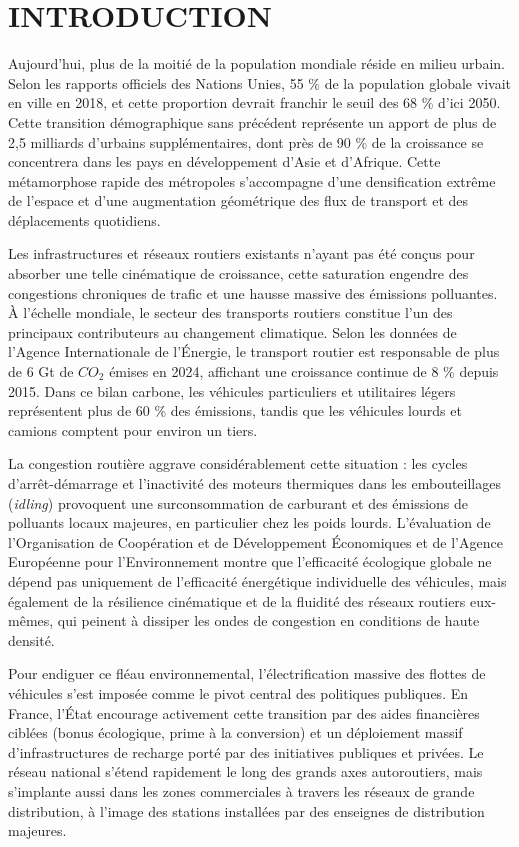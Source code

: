 \documentclass[10pt, a4paper]{article}
\begin{document}
\newpage

\section{INTRODUCTION}\label{introduction}

Aujourd'hui, plus de la moitié de la population mondiale réside en
milieu urbain. Selon les rapports officiels des Nations Unies, 55 \% de
la population globale vivait en ville en 2018, et cette proportion
devrait franchir le seuil des 68 \% d'ici 2050. Cette transition
démographique sans précédent représente un apport de plus de 2,5
milliards d'urbains supplémentaires, dont près de 90 \% de la croissance
se concentrera dans les pays en développement d'Asie et d'Afrique. Cette
métamorphose rapide des métropoles s'accompagne d'une densification
extrême de l'espace et d'une augmentation géométrique des flux de
transport et des déplacements quotidiens.

Les infrastructures et réseaux routiers existants n'ayant pas été conçus
pour absorber une telle cinématique de croissance, cette saturation
engendre des congestions chroniques de trafic et une hausse massive des
émissions polluantes. À l'échelle mondiale, le secteur des transports
routiers constitue l'un des principaux contributeurs au changement
climatique. Selon les données de l'Agence Internationale de l'Énergie,
le transport routier est responsable de plus de 6 Gt de \(CO_2\) émises
en 2024, affichant une croissance continue de 8 \% depuis 2015. Dans ce
bilan carbone, les véhicules particuliers et utilitaires légers
représentent plus de 60 \% des émissions, tandis que les véhicules
lourds et camions comptent pour environ un tiers.

La congestion routière aggrave considérablement cette situation : les
cycles d'arrêt-démarrage et l'inactivité des moteurs thermiques dans les
embouteillages (\emph{idling}) provoquent une surconsommation de
carburant et des émissions de polluants locaux majeures, en particulier
chez les poids lourds. L'évaluation de l'Organisation de Coopération et
de Développement Économiques et de l'Agence Européenne pour
l'Environnement montre que l'efficacité écologique globale ne dépend pas
uniquement de l'efficacité énergétique individuelle des véhicules, mais
également de la résilience cinématique et de la fluidité des réseaux
routiers eux-mêmes, qui peinent à dissiper les ondes de congestion en
conditions de haute densité.

Pour endiguer ce fléau environnemental, l'électrification massive des
flottes de véhicules s'est imposée comme le pivot central des politiques
publiques. En France, l'État encourage activement cette transition par
des aides financières ciblées (bonus écologique, prime à la conversion)
et un déploiement massif d'infrastructures de recharge porté par des
initiatives publiques et privées. Le réseau national s'étend rapidement
le long des grands axes autoroutiers, mais s'implante aussi dans les
zones commerciales à travers les réseaux de grande distribution, à
l'image des stations installées par des enseignes de distribution
majeures.
\end{document}
